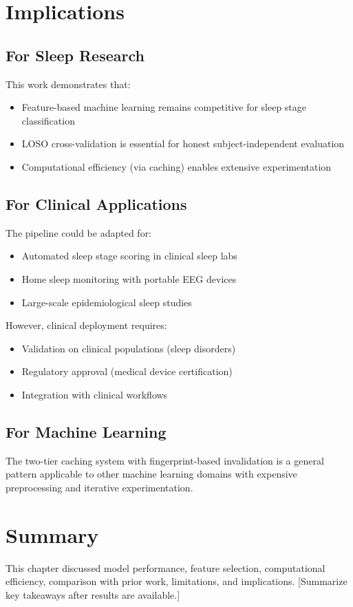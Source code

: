 \section{Implications}
\label{sec:implications}

\subsection{For Sleep Research}
\label{subsec:research_implications}

This work demonstrates that:

\begin{itemize}
    \item Feature-based machine learning remains competitive for sleep stage classification
    \item LOSO cross-validation is essential for honest subject-independent evaluation
    \item Computational efficiency (via caching) enables extensive experimentation
\end{itemize}

\subsection{For Clinical Applications}
\label{subsec:clinical_implications}

The pipeline could be adapted for:

\begin{itemize}
    \item Automated sleep stage scoring in clinical sleep labs
    \item Home sleep monitoring with portable EEG devices
    \item Large-scale epidemiological sleep studies
\end{itemize}

However, clinical deployment requires:
\begin{itemize}
    \item Validation on clinical populations (sleep disorders)
    \item Regulatory approval (medical device certification)
    \item Integration with clinical workflows
\end{itemize}

\subsection{For Machine Learning}
\label{subsec:ml_implications}

The two-tier caching system with fingerprint-based invalidation is a general pattern applicable to other machine learning domains with expensive preprocessing and iterative experimentation.

\section{Summary}
\label{sec:discussion_summary}

This chapter discussed model performance, feature selection, computational efficiency, comparison with prior work, limitations, and implications. [Summarize key takeaways after results are available.]
